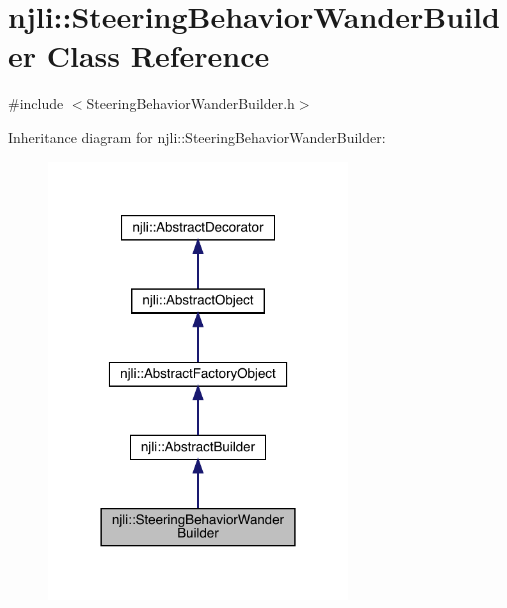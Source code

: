 \hypertarget{classnjli_1_1_steering_behavior_wander_builder}{}\section{njli\+:\+:Steering\+Behavior\+Wander\+Builder Class Reference}
\label{classnjli_1_1_steering_behavior_wander_builder}


{\ttfamily \#include $<$Steering\+Behavior\+Wander\+Builder.\+h$>$}



Inheritance diagram for njli\+:\+:Steering\+Behavior\+Wander\+Builder\+:\nopagebreak
\begin{figure}[H]
\begin{center}
\leavevmode
\includegraphics[width=225pt]{classnjli_1_1_steering_behavior_wander_builder__inherit__graph}
\end{center}
\end{figure}


